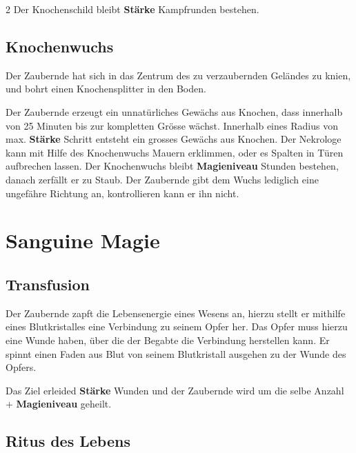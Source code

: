 \begin{multicols*}{2}
Der Knochenschild bleibt \textbf{Stärke} Kampfrunden bestehen.



\subsection{Knochenwuchs}

Der Zaubernde hat sich in das Zentrum des zu verzaubernden Geländes zu knien, und bohrt einen Knochensplitter in den Boden.

Der Zaubernde erzeugt ein unnatürliches Gewächs aus Knochen, dass innerhalb von 25 Minuten bis zur kompletten Grösse wächst. Innerhalb eines Radius von max. \textbf{Stärke} Schritt entsteht ein grosses Gewächs aus Knochen. Der Nekrologe kann mit Hilfe des Knochenwuchs Mauern erklimmen, oder es Spalten in Türen aufbrechen lassen. Der Knochenwuchs bleibt \textbf{Magieniveau} Stunden bestehen, danach zerfällt er zu Staub. Der Zaubernde gibt dem Wuchs lediglich eine ungefähre Richtung an, kontrollieren kann er ihn nicht.



\section{Sanguine Magie}

\subsection{Transfusion}

Der Zaubernde zapft die Lebensenergie eines Wesens an, hierzu stellt er mithilfe eines Blutkristalles eine Verbindung zu seinem Opfer her. Das Opfer muss hierzu eine Wunde haben, über die der Begabte die Verbindung herstellen kann. Er spinnt einen Faden aus Blut von seinem Blutkristall ausgehen zu der Wunde des Opfers.

Das Ziel erleided \textbf{Stärke} Wunden und der Zaubernde wird um die selbe Anzahl + \textbf{Magieniveau} geheilt.



\subsection{Ritus des Lebens}


\end{multicols*}
